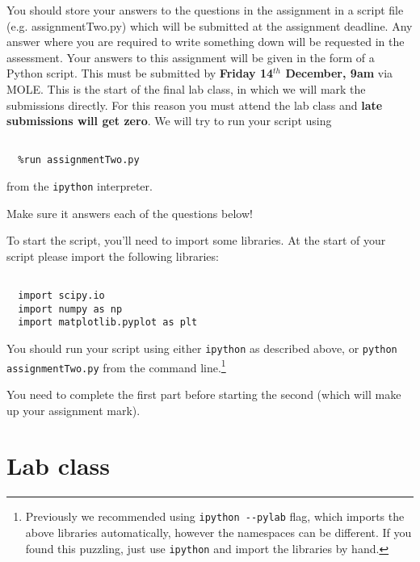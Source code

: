 \documentclass{article}
\begin{document}
You should store your answers to the questions in the assignment in a
script file (e.g. assignmentTwo.py) which will be submitted at the
assignment deadline. Any answer where you are required to write
something down will be requested in the assessment. Your answers to
this assignment will be given in the form of a Python script. This
must be submitted by \textbf{Friday 14$^{th}$ December, 9am} via MOLE.
This is the start of the final lab class, in which we will mark the
submissions directly. For this reason you must attend the lab class
and \textbf{late submissions will get zero}. We will
try to run your script using
\lstset{language=python,basicstyle=\ttfamily}
\begin{verbatim}

  %run assignmentTwo.py
\end{verbatim}
from the \lstinline+ipython+ interpreter.

Make sure it answers each of the questions below!

To start the script, you'll need to import some libraries. At the start of your script please import the following libraries:
\begin{verbatim}

  import scipy.io
  import numpy as np
  import matplotlib.pyplot as plt
\end{verbatim}
You should run your script using either \lstinline+ipython+ as described above, or \lstinline+python assignmentTwo.py+  from the command line.\footnote{Previously we recommended using \lstinline+ipython --pylab+ flag, which imports the above libraries automatically, however the namespaces can be different. If you found this puzzling, just use \lstinline+ipython+ and import the libraries by hand.}

You need to complete the first part before starting the second (which will make up your assignment mark).

\part{Lab class}
\end{document}
